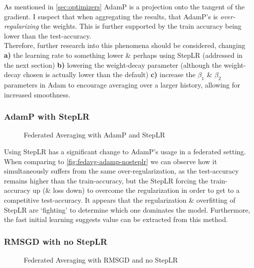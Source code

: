 As mentioned in \autoref{sec:optimizers} AdamP is a projection onto the tangent of the gradient. I suspect that when aggregating the results, that AdamP's is \textit{over-regularizing} the weights. This is further supported by the train accuracy being lower than the test-accuracy. \\

Therefore, further research into this phenomena should be considered, changing \textbf{a)} the learning rate to something lower \& perhaps using StepLR (addressed in the next section)  \textbf{b)} lowering the weight-decay parameter (although the weight-decay chosen is actually lower than the default) \textbf{c)} increase the $\beta_1$ \& $\beta_2$ parameters in Adam to encourage averaging over a larger history, allowing for increased smoothness. 

\subsubsection{AdamP with StepLR}

\begin{figure}[H]
    \centering
    \hspace{-0.80cm}
    \caption{Federated Averaging with AdamP and StepLR}
    \label{fig:fedavg-adamp-steplr}
\end{figure}

Using StepLR has a significant change to AdamP's usage in a federated setting. When comparing to \autoref{fig:fedavg-adamp-nosteplr} we can observe how it simultaneously suffers from the same over-regularization, as the test-accuracy remains higher than the train-accuracy, but the StepLR forcing the train-accuracy up (\& loss down) to overcome the regularization in order to get to a competitive test-accuracy. It appears that the regularization \& overfitting of StepLR are `fighting' to determine which one dominates the model. Furthermore, the fast initial learning suggests value can be extracted from this method.
\newpage
\subsubsection{RMSGD with no StepLR}

\begin{figure}[H]
    \centering
    \hspace{-0.80cm}
    \caption{Federated Averaging with RMSGD and no StepLR}
    \label{fig:fedavg-rmsgd-nosteplr}
\end{figure}

